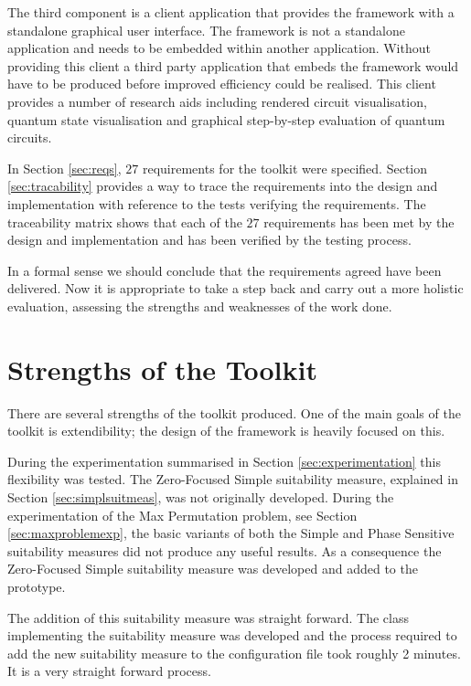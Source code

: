The third component is a client application that provides the framework with a standalone graphical user interface.
The framework is not a standalone application and needs to be embedded within another application.
Without providing this client a third party application that embeds the framework would have to be produced before improved efficiency could be realised.
This client provides a number of research aids including rendered circuit visualisation, quantum state visualisation and graphical step-by-step evaluation of quantum circuits.

In Section \ref{sec:reqs}, $27$ requirements for the toolkit were specified.
Section \ref{sec:tracability} provides a way to trace the requirements into the design and implementation with reference to the tests verifying the requirements.
The traceability matrix shows that each of the $27$ requirements has been met by the design and implementation and has been verified by the testing process.

In a formal sense we should conclude that the requirements agreed have been delivered.
Now it is appropriate to take a step back and carry out a more holistic evaluation, assessing the strengths and weaknesses of the work done.

\section{Strengths of the Toolkit}

There are several strengths of the toolkit produced.
One of the main goals of the toolkit is extendibility; the design of the framework is heavily focused on this.

During the experimentation summarised in Section \ref{sec:experimentation} this flexibility was tested.
The Zero-Focused Simple suitability measure, explained in Section \ref{sec:simplsuitmeas}, was not originally developed.
During the experimentation of the Max Permutation problem, see Section \ref{sec:maxproblemexp}, the basic variants of both the Simple and Phase Sensitive suitability measures did not produce any useful results.
As a consequence the Zero-Focused Simple suitability measure was developed and added to the prototype.

The addition of this suitability measure was straight forward.
The class implementing the suitability measure was developed and the process required to add the new suitability measure to the configuration file took roughly 2 minutes.
It is a very straight forward process.

